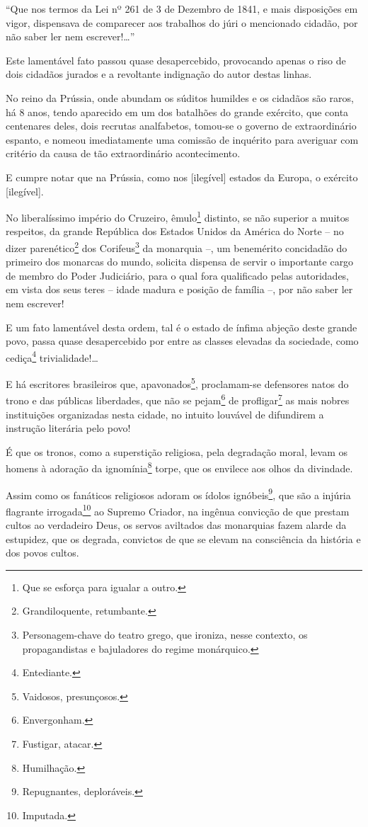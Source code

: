 ``Que nos termos da Lei nº 261 de 3 de Dezembro de 1841, e mais
disposições em vigor, dispensava de comparecer aos trabalhos do júri o
mencionado cidadão, por não saber ler nem escrever!\ldots''

Este lamentável fato passou quase desapercebido, provocando apenas o
riso de dois cidadãos jurados e a revoltante indignação do autor destas
linhas.

No reino da Prússia, onde abundam os súditos humildes e os cidadãos são
raros, há 8 anos, tendo aparecido em um dos batalhões do grande
exército, que conta centenares deles, dois recrutas analfabetos,
tomou-se o governo de extraordinário espanto, e nomeou imediatamente uma
comissão de inquérito para averiguar com critério da causa de tão
extraordinário acontecimento.

E cumpre notar que na Prússia, como nos {[}ilegível{]} estados da
Europa, o exército {[}ilegível{]}.

No liberalíssimo império do Cruzeiro, êmulo\footnote{Que se esforça
  para igualar a outro.} distinto, se não superior a muitos respeitos,
da grande República dos Estados Unidos da América do Norte -- no dizer
parenético\footnote{Grandiloquente, retumbante.} dos
Corifeus\footnote{Personagem-chave do teatro grego, que ironiza, nesse
  contexto, os propagandistas e bajuladores do regime monárquico.} da
monarquia --, um benemérito concidadão do primeiro dos monarcas do
mundo, solicita dispensa de servir o importante cargo de membro do Poder
Judiciário, para o qual fora qualificado pelas autoridades, em vista dos
seus teres -- idade madura e posição de família --, por não saber ler
nem escrever!

E um fato lamentável desta ordem, tal é o estado de ínfima abjeção deste
grande povo, passa quase desapercebido por entre as classes elevadas da
sociedade, como cediça\footnote{Entediante.} trivialidade!\ldots

E há escritores brasileiros que, apavonados\footnote{Vaidosos,
  presunçosos.}, proclamam-se defensores natos do trono e das públicas
liberdades, que não se pejam\footnote{Envergonham.} de
profligar\footnote{Fustigar, atacar.} as mais nobres instituições
organizadas nesta cidade, no intuito louvável de difundirem a instrução
literária pelo povo!

É que os tronos, como a superstição religiosa, pela degradação moral,
levam os homens à adoração da ignomínia\footnote{Humilhação.} torpe,
que os envilece aos olhos da divindade.

Assim como os fanáticos religiosos adoram os ídolos ignóbeis\footnote{
  Repugnantes, deploráveis.}, que são a injúria flagrante
irrogada\footnote{Imputada.} ao Supremo Criador, na ingênua convicção
de que prestam cultos ao verdadeiro Deus, os servos aviltados das
monarquias fazem alarde da estupidez, que os degrada, convictos de que
se elevam na consciência da história e dos povos cultos.

